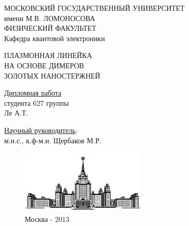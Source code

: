 \begin{titlepage}
\begin{center}
{\Large

МОСКОВСКИЙ ГОСУДАРСТВЕННЫЙ УНИВЕРСИТЕТ\\
имени М.В. ЛОМОНОСОВА\\
ФИЗИЧЕСКИЙ ФАКУЛЬТЕТ\\
Кафедра квантовой электроники

\vspace{5cm}

ПЛАЗМОННАЯ ЛИНЕЙКА \\
НА ОСНОВЕ ДИМЕРОВ \\
ЗОЛОТЫХ НАНОСТЕРЖНЕЙ

}
\end{center}


\vspace{4cm}
\begin{flushright}
\underline{Дипломная работа}\\
студента 627 группы\\
Ле А.Т.

\vspace{1cm}

\underline{Научный руководитель}:\\
м.н.с., к.ф-м.н. Щербаков М.Р.\\
\end{flushright}

\vspace{1cm}
\begin{figure}[b]
\centering
\includegraphics[width=60mm]{img/msu.jpg}\\
Москва - 2013
\end{figure}

\end{titlepage}